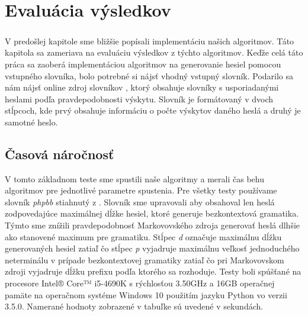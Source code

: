 \chapter{Evaluácia výsledkov}

\paragraph{}
V predošlej kapitole sme bližšie popísali implementáciu našich algoritmov. Táto kapitola sa zameriava na evaluáciu výsledkov z týchto algoritmov. Keďže celá táto práca sa zaoberá implementáciou algoritmov na generovanie hesiel pomocou vstupného slovníka, bolo potrebné si nájsť vhodný vstupný slovník. Podarilo sa nám nájsť online zdroj slovníkov \cite{dictionaries}, ktorý obsahuje slovníky s usporiadanými heslami podľa pravdepodobnosti výskytu. Slovník je formátovaný v dvoch stĺpcoch, kde prvý obsahuje informáciu o počte výskytov daného heslá a druhý je samotné heslo.

\section{Časová náročnosť}
\label{sec:time}
V tomto základnom teste sme spustili naše algoritmy a merali čas behu algoritmov pre jednotlivé parametre spustenia. Pre všetky testy používame slovník \emph{phpbb} stiahnutý z \cite{dictionaries}. Slovník sme upravovali aby obsahoval len heslá zodpovedajúce maximálnej dĺžke hesiel, ktoré generuje bezkontextová gramatika. Týmto sme znížili pravdepodobnosť Markovovského zdroja generovať heslá dlhšie ako stanovené maximum pre gramatiku. Stĺpec \emph{d} označuje maximálnu dĺžku generovaných hesiel zatiaľ čo stĺpec \emph{p} vyjadruje maximálnu veľkosť jednoduchého neterminálu v prípade bezkontextovej gramatiky zatiaľ čo pri Markovovskom zdroji vyjadruje dĺžku prefixu podľa ktorého sa rozhoduje. Testy boli spúšťané na procesore Intel® Core™ i5-4690K s rýchlosťou 3.50GHz a 16GB operačnej pamäte na operačnom systéme Windows 10 použitím jazyku Python vo verzii 3.5.0. Namerané hodnoty zobrazené v tabuľke sú uvedené v sekundách.

